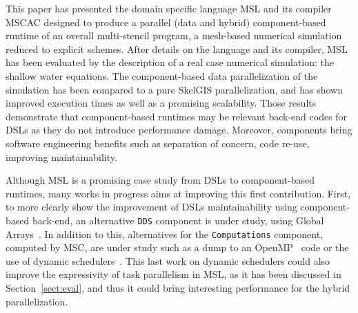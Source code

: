 This paper has presented the domain specific language MSL and its compiler MSCAC designed to produce a parallel (data and hybrid) component-based runtime of an overall multi-stencil program, \ie a mesh-based numerical simulation reduced to explicit schemes. After details on the language and its compiler, MSL has been evaluated by the description of a real case numerical simulation: the shallow water equations. The component-based data parallelization of the simulation has been compared to a pure SkelGIS parallelization, and has shown improved execution times as well as a promising scalability. Those results demonstrate that component-based runtimes may be relevant back-end codes for DSLs as they do not introduce performance damage. Moreover, components bring software engineering benefits such as separation of concern, code re-use, improving maintainability.

Although MSL is a promising case study from DSLs to component-based runtimes, many works in progress aims at improving this first contribution. First, to more clearly show the improvement of DSLs maintainability using component-based back-end, an alternative \texttt{DDS} component is under study, using Global Arrays~\cite{Nieplocha:2006:AAP:1125980.1125985}. In addition to this, alternatives for the \texttt{Computations} component, computed by MSC, are under study such as a dump to an OpenMP~\cite{660313} code or the use of dynamic schedulers~\cite{Augonnet2011,Gautier:2013:XRS:2510661.2511383}. This last work on dynamic schedulers could also improve the expressivity of task parallelism in MSL, as it has been discussed in Section~\ref{sect:eval}, and thus it could bring interesting performance for the hybrid parallelization.
